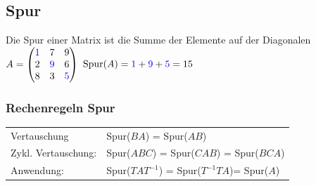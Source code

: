 		  	
			\subsection{Spur}		  	
			Die Spur einer Matrix ist die Summe der Elemente auf der Diagonalen \\
			
			$A =  \begin{pmatrix}	\textcolor{blue}{1} & 7 & 9 \\ 2 & \textcolor{blue}{9} & 6 \\ 8 & 3 & \textcolor{blue}{5}	\end{pmatrix}$	   \qquad 	$\mathrm{Spur}(A) = \textcolor{blue}{1} + \textcolor{blue}{9} + \textcolor{blue}{5} = 15$ 
		  	
		  	\subsubsection{Rechenregeln Spur}
		  	\begin{tabular}{ll}
		  	Vertauschung & Spur($BA$) = Spur($AB$) \\
		  	Zykl. Vertauschung: & Spur($ABC$) = Spur($CAB$) = Spur($BCA$)\\
		  	Anwendung: & Spur($TAT^{-1}$) = Spur($T^{-1}TA$)= Spur($A$)\\
		  	\end{tabular}
		  	
